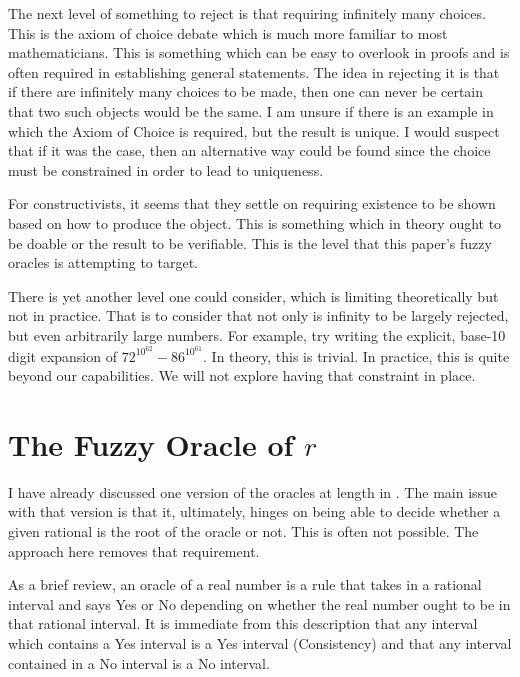 \documentclass[12pt]{article}
\begin{document}
The next level of something to reject is that requiring infinitely many choices. This is the axiom of choice debate which is much more familiar to most mathematicians. This is something which can be easy to overlook in proofs and is often required in establishing general statements. The idea in rejecting it is that if there are infinitely many choices to be made, then one can never be certain that two such objects would be the same. I am unsure if there is an example in which the Axiom of Choice is required, but the result is unique. I would suspect that if it was the case, then an alternative way could be found since the choice must be constrained in order to lead to uniqueness. 

For constructivists, it seems that they settle on requiring existence to be shown based on how to produce the object. This is something which in theory ought to be doable or the result to be verifiable. This is the level that this paper's fuzzy oracles is attempting to target. 

There is yet another level one could consider, which is limiting theoretically but not in practice. That is to consider that not only is infinity to be largely rejected, but even arbitrarily large numbers. For example, try writing the explicit, base-10 digit expansion of $72^{10^{62}} - 86^{10^{61}}$. In theory, this is trivial. In practice, this is quite beyond our capabilities. We will not explore having that constraint in place. 



\section{The Fuzzy Oracle of \texorpdfstring{$r$}{r}}\label{sec:ora}

I have already discussed one version of the oracles at length in \cite{taylor23main}. The main issue with that version is that it, ultimately, hinges on being able to decide whether a given rational is the root of the oracle or not. This is often not possible. The approach here removes that requirement. 

As a brief review, an oracle of a real number is a rule that takes in a rational interval and says Yes or No depending on whether the real number ought to be in that rational interval. It is immediate from this description that any interval which contains a Yes interval is a Yes interval (Consistency) and that any interval contained in a No interval is a No interval. 
\end{document}
